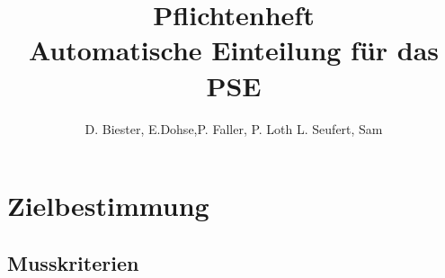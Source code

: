 \documentclass[parskip=full]{scrartcl}
\begin{document}
\title{Pflichtenheft \\
        \large Automatische Einteilung für das PSE}

\author{D. Biester, E.Dohse,P. Faller, P. Loth L. Seufert, Sam}
        
\maketitle
\vfill

\tableofcontents


\section{Zielbestimmung}


\subsection{Musskriterien}
\end{document}
